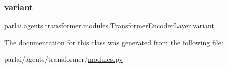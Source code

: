 \subsubsection{\texorpdfstring{variant}{variant}}
{\footnotesize\ttfamily parlai.\+agents.\+transformer.\+modules.\+Transformer\+Encoder\+Layer.\+variant}



The documentation for this class was generated from the following file\+:\begin{DoxyCompactItemize}
\item 
parlai/agents/transformer/\hyperlink{parlai_2agents_2transformer_2modules_8py}{modules.\+py}\end{DoxyCompactItemize}
